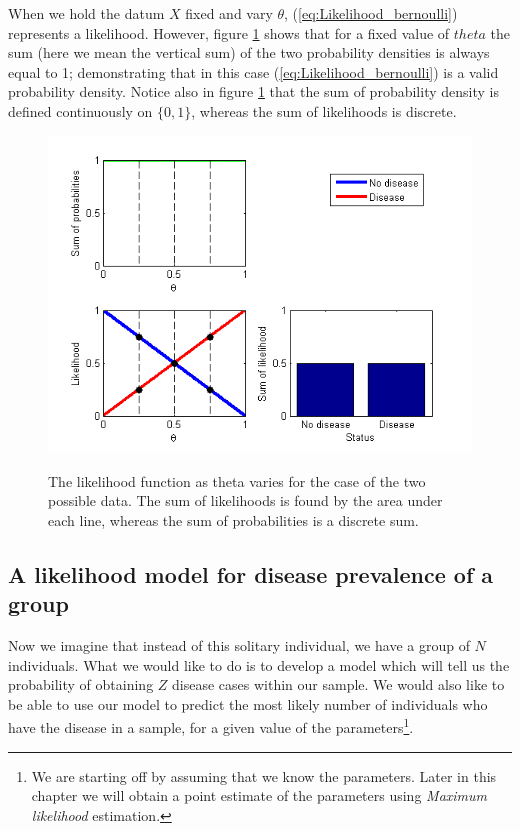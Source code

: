 \documentclass[11pt,fullpage]{book}
\begin{document}
When we hold the datum $X$ fixed and vary $\theta$, (\ref{eq:Likelihood_bernoulli}) represents a likelihood. However, figure \ref{fig:Likelihood_bernoulli} shows that for a fixed value of $theta$ the sum (here we mean the vertical sum) of the two probability densities is always equal to 1; demonstrating that in this case (\ref{eq:Likelihood_bernoulli}) is a valid probability density. Notice also in figure \ref{fig:Likelihood_bernoulli} that the sum of probability density is defined continuously on $\{0,1\}$, whereas the sum of likelihoods is discrete.

\begin{figure}
\centering
\scalebox{0.75} 
{\includegraphics{likelihood_bernoulli.png}}
\caption{The likelihood function as theta varies for the case of the two possible data. The sum of likelihoods is found by the area under each line, whereas the sum of probabilities is a discrete sum.}\label{fig:Likelihood_bernoulli}
\end{figure}

\subsection{A likelihood model for disease prevalence of a group}\label{sec:Likelihood_diseaseGroup}
Now we imagine that instead of this solitary individual, we have a group of $N$ individuals. What we would like to do is to develop a model which will tell us the probability of obtaining $Z$ disease cases within our sample. We would also like to be able to use our model to predict the most likely number of individuals who have the disease in a sample, for a given value of the parameters\footnote{We are starting off by assuming that we know the parameters. Later in this chapter we will obtain a point estimate of the parameters using \textit{Maximum likelihood} estimation.}. 
\end{document}
